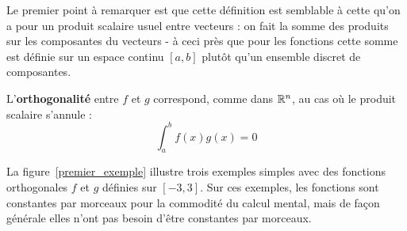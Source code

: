Le premier point à remarquer est que cette définition est semblable à cette qu'on a pour un produit scalaire usuel entre vecteurs : on fait la somme des produits sur les composantes du vecteurs - à ceci près que pour les fonctions cette somme est définie sur un espace continu  $[a,b]$ plutôt qu'un ensemble discret de composantes.

L'\textbf{orthogonalité} entre $f$ et $g$ correspond, comme dans $\mathbb{R}^n$,
au cas où le produit scalaire s'annule :
\begin{equation}
\int_a^b f(x)g(x)=0
\end{equation}


La figure~\ref{premier_exemple} illustre trois exemples simples avec des fonctions orthogonales $f$ et $g$ définies sur $[-3,3]$. Sur ces exemples, les fonctions sont constantes par morceaux pour la commodité du calcul mental, mais de façon générale elles n'ont pas besoin d'être constantes par morceaux.

